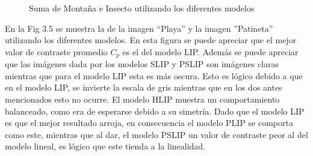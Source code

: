 \begin{figure}
\begin{center}
		\caption{Suma de Monta\~na e Insecto utilizando los diferentes modelos}
	\end{center}
\end{figure}

En la Fig 3.5 se muestra la de la imagen  ``Playa'' y la imagen ''Patineta'' utilizando los diferentes modelos. En esta figura se puede apreciar que el mejor valor de contraste promedio $C_p$ es el del modelo LIP. Adem\'as se puede apreciar que las im\'agenes dada por los modelos SLIP y PSLIP son im\'agenes claras mientras que para el modelo LIP esta es m\'as oscura. Esto es l\'ogico debido a que en el modelo LIP, se invierte la escala de gris mientras que en los dos antes mencionados esto no ocurre. El modelo HLIP muestra un comportamiento balanceado, como era de esperarse debido a su simetr\'ia. Dado que el modelo LIP es que el mejor resultado arroja, en consecuencia el modelo PLIP se comporta como este, mientras que al dar, el modelo PSLIP un valor de contraste peor al del modelo lineal, es l\'ogico que este tienda a la linealidad.

